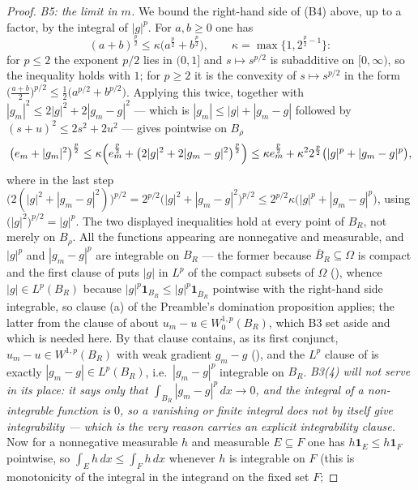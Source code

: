 \begin{proof}
\emph{B5: the limit in $m$.}  We bound the right-hand side of (B4) above, up to a
factor, by the integral of $|g|^p$.  For $a,b\ge0$ one has
\[
(a+b)^{\frac p2}\le\kappa\bigl(a^{\frac p2}+b^{\frac p2}\bigr),
\qquad \kappa=\max\{1,2^{\frac p2-1}\} :
\]
for $p\le2$ the exponent $p/2$ lies in $(0,1]$ and $s\mapsto s^{p/2}$ is
subadditive on $[0,\infty)$, so the inequality holds with $1$; for $p\ge2$ it is
the convexity of $s\mapsto s^{p/2}$ in the form
$\bigl(\frac{a+b}2\bigr)^{p/2}\le\frac12\bigl(a^{p/2}+b^{p/2}\bigr)$.  Applying
this twice, together with $|g_m|^2\le2|g|^2+2|g_m-g|^2$ --- which is
$|g_m|\le|g|+|g_m-g|$ followed by $(s+u)^2\le2s^2+2u^2$ --- gives pointwise
on $B_\rho$
\[
\bigl(e_m+|g_m|^2\bigr)^{\frac p2}
\le\kappa\Bigl(e_m^{\frac p2}+\bigl(2|g|^2+2|g_m-g|^2\bigr)^{\frac p2}\Bigr)
\le\kappa e_m^{\frac p2}+\kappa^2 2^{\frac p2}\bigl(|g|^p+|g_m-g|^p\bigr),
\]
where in the last step $\bigl(2(|g|^2+|g_m-g|^2)\bigr)^{p/2}
=2^{p/2}\bigl(|g|^2+|g_m-g|^2\bigr)^{p/2}
\le2^{p/2}\kappa\bigl(|g|^p+|g_m-g|^p\bigr)$, using
$\bigl(|g|^2\bigr)^{p/2}=|g|^p$.  The two displayed inequalities hold at every
point of $B_R$, not merely on $B_\rho$.  All the functions appearing are
nonnegative and measurable, and $|g|^p$ and $|g_m-g|^p$ are integrable on $B_R$ --- the former
because $\overline B_R\subseteq\Omega$ is compact and the first clause of
 puts $|g|$ in $L^p$ of the compact subsets of
$\Omega$ (), whence $|g|\in L^p(B_R)$ because
$|g|^p\mathbf 1_{B_R}\le|g|^p\mathbf 1_{\overline B_R}$ pointwise with the
right-hand side integrable, so clause (a) of the Preamble's domination
proposition applies; the latter from the clause of
 about $u_m-u\in W^{1,p}_0(B_R)$, which B3 set
aside and which is needed here.  By  that clause contains,
as its first conjunct, $u_m-u\in W^{1,p}(B_R)$ with weak gradient $g_m-g$
(), and the $L^p$ clause of  is exactly
$|g_m-g|\in L^p(B_R)$, i.e.\ $|g_m-g|^p$ integrable on $B_R$.  \emph{B3(4) will
not serve in its place: it says only that $\int_{B_R}|g_m-g|^p\,dx\to0$, and the
integral of a non-integrable function is $0$, so a vanishing or finite integral
does not by itself give integrability --- which is the very reason
 carries an explicit integrability clause.}  Now for a nonnegative
measurable $h$ and measurable $E\subseteq F$ one has $h\mathbf 1_E\le h\mathbf
1_F$ pointwise, so $\int_Eh\,dx\le\int_Fh\,dx$ whenever $h$ is integrable on $F$
(this is monotonicity of the integral in the integrand on the fixed set $F$;

\end{proof}
